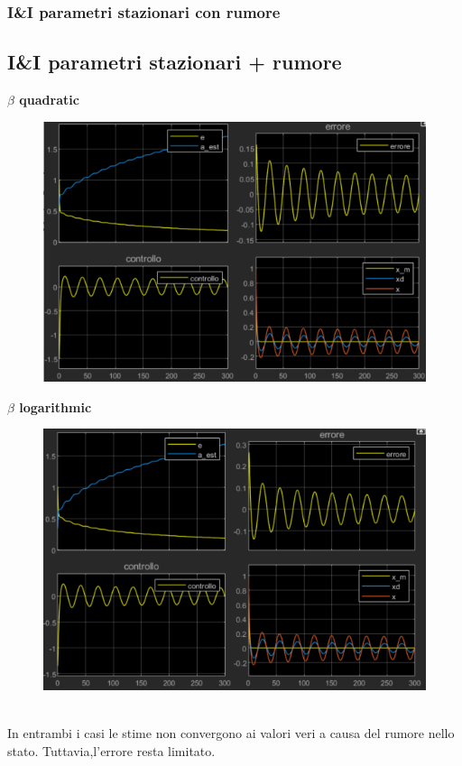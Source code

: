 \documentclass{beamer}
\begin{document}
\begin{frame}
	\frametitle{I\&I parametri stazionari con rumore}
	\subsection{I\&I parametri stazionari + rumore}
	\begin{minipage}[t]{0.45\textwidth}
		\textbf{\(\beta \) quadratic}
		\begin{figure}
			\includegraphics[scale=0.35]{2022-05-21-10-34-18.png} %
		\end{figure}
	\end{minipage}
	\begin{minipage}[t]{0.45\textwidth}
		\textbf{\(\beta \) logarithmic}
		\begin{figure}
			\includegraphics[scale=0.35]{2022-05-21-10-30-59.png} %
		\end{figure}
	\end{minipage}
	\vspace{0.1cm}\\
	In entrambi i casi le stime non convergono ai valori veri a causa del rumore nello stato. Tuttavia,l'errore resta limitato.
\end{frame}
\end{document}

